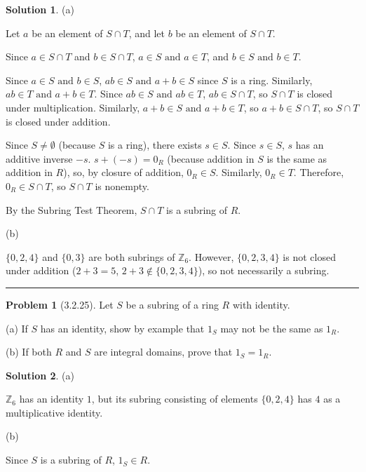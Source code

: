 \documentclass[12pt]{article}
\theoremstyle{definition}
\newtheorem*{prob}{Problem}
\newtheorem*{soln}{Solution}
\newcommand{\hr}{\vspace*{\parskip}\hrule}
\newcommand{\ZZ}{{\mathbb{Z}}}
\begin{document}
\begin{soln}

(a)

Let $a$ be an element of $S\cap T$, and let $b$ be an element of $S\cap T$.

\renewcommand\land{\text{ and }}
Since $a\in S\cap T$ and $b\in S\cap T$, $a\in S\land a\in T$, and $b\in S\land b\in T$.

Since $a\in S\land b\in S$, $ab\in S\land a+b\in S$ since $S$ is a ring.
Similarly, $ab\in T\land a+b\in T$.
Since $ab\in S\land ab\in T$, $ab\in S\cap T$, so $S\cap T$ is closed under multiplication.
Similarly, $a+b\in S\land a+b\in T$, so $a+b\in S\cap T$, so $S\cap T$ is closed under addition.

Since $S\neq\emptyset$ (because $S$ is a ring), there exists $s\in S$.
Since $s\in S$, $s$ has an additive inverse $-s$.
$s+(-s)=0_R$ (because addition in $S$ is the same as addition in $R$),
so, by closure of addition, $0_R\in S$.
Similarly, $0_R\in T$.
Therefore, $0_R\in S\cap T$, so $S\cap T$ is nonempty.

By the Subring Test Theorem, $S\cap T$ is a subring of $R$.

(b)

$\{0, 2, 4\}$ and $\{0, 3\}$ are both subrings of $\ZZ_6$.
However, $\{0, 2, 3, 4\}$ is not closed under addition
($2+3=5$, $2+3\not\in\{0,2,3,4\}$),
so not necessarily a subring.

\end{soln}

\hr


%
%
%
%


\begin{prob}[3.2.25] Let $S$ be a subring of a ring $R$ with identity.

(a) If $S$ has an identity, show by example that $1_S$ may not be the same as $1_R$.

(b) If both $R$ and $S$ are integral domains, prove that $1_S=1_R$.
\end{prob}

\begin{soln} (a)

$\ZZ_6$ has an identity $1$, but its subring consisting of elements
$\{0, 2, 4\}$ has $4$ as a multiplicative identity.

(b)

Since $S$ is a subring of $R$, $1_S\in R$.


\end{soln}
\end{document}

